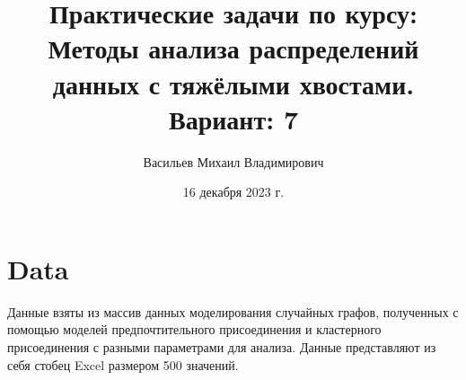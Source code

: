 \documentclass[reprint, amsmath, amssymb, aps,]{revtex4-2}
\begin{document}
\title{Практические задачи по курсу: Методы анализа распределений данных с тяжёлыми хвостами. Вариант: 7}



\author{Васильев Михаил Владимирович}
%


\date{16 декабря 2023 г.}%
             


\maketitle

\section{Data}
Данные взяты из массив данных моделирования случайных графов, полученных с помощью моделей предпочтительного присоединения и кластерного присоединения с разными параметрами для анализа. Данные представляют из себя стобец Excel размером 500 значений. 
\end{document}
